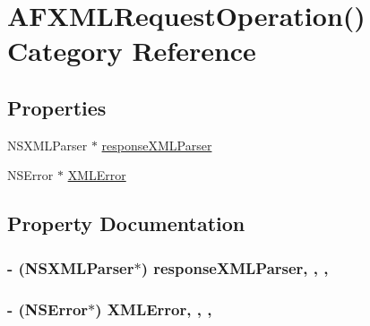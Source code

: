\hypertarget{category_a_f_x_m_l_request_operation_07_08}{\section{A\-F\-X\-M\-L\-Request\-Operation() Category Reference}
\label{category_a_f_x_m_l_request_operation_07_08}
}
\subsection*{Properties}
\begin{DoxyCompactItemize}
\item 
N\-S\-X\-M\-L\-Parser $\ast$ \hyperlink{category_a_f_x_m_l_request_operation_07_08_ab74b1a873fc6d5b3c4f6437a6783d9f6}{response\-X\-M\-L\-Parser}
\item 
N\-S\-Error $\ast$ \hyperlink{category_a_f_x_m_l_request_operation_07_08_a9772e537e23c5a40af9b9651cbe76449}{X\-M\-L\-Error}
\end{DoxyCompactItemize}


\subsection{Property Documentation}
\hypertarget{category_a_f_x_m_l_request_operation_07_08_ab74b1a873fc6d5b3c4f6437a6783d9f6}{
\subsubsection[{response\-X\-M\-L\-Parser}]{\setlength{\rightskip}{0pt plus 5cm}-\/ (N\-S\-X\-M\-L\-Parser$\ast$) response\-X\-M\-L\-Parser\hspace{0.3cm}{\ttfamily [read]}, {\ttfamily [write]}, {\ttfamily [nonatomic]}, {\ttfamily [strong]}}}\label{category_a_f_x_m_l_request_operation_07_08_ab74b1a873fc6d5b3c4f6437a6783d9f6}
\hypertarget{category_a_f_x_m_l_request_operation_07_08_a9772e537e23c5a40af9b9651cbe76449}{
\subsubsection[{X\-M\-L\-Error}]{\setlength{\rightskip}{0pt plus 5cm}-\/ (N\-S\-Error$\ast$) X\-M\-L\-Error\hspace{0.3cm}{\ttfamily [read]}, {\ttfamily [write]}, {\ttfamily [nonatomic]}, {\ttfamily [strong]}}}\label{category_a_f_x_m_l_request_operation_07_08_a9772e537e23c5a40af9b9651cbe76449}


